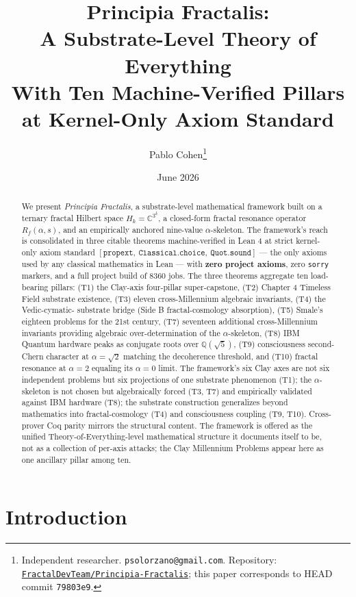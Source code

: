 \documentclass[11pt,a4paper]{article}
\title{Principia Fractalis:\\
A Substrate-Level Theory of Everything\\[0.3em]
\large With Ten Machine-Verified Pillars at Kernel-Only Axiom Standard}
\author{Pablo Cohen\thanks{Independent researcher. \texttt{psolorzano@gmail.com}.
Repository: \href{https://github.com/FractalDevTeam/Principia-Fractalis}%
{\texttt{FractalDevTeam/Principia-Fractalis}}; this paper corresponds
to HEAD commit \texttt{79803e9}.}}
\date{June 2026}
\theoremstyle{definition}
\begin{document}
\maketitle

\begin{abstract}
We present \emph{Principia Fractalis}, a substrate-level
mathematical framework built on a ternary fractal Hilbert space
$H_k = \mathbb{C}^{3^k}$, a closed-form fractal resonance operator
$R_f(\alpha, s)$, and an empirically anchored nine-value
$\alpha$-skeleton. The framework's reach is consolidated in three
citable theorems machine-verified in Lean 4 at strict
kernel-only axiom standard
$[\texttt{propext},\ \texttt{Classical.choice},\ \texttt{Quot.sound}]$
--- the only axioms used by any classical mathematics in Lean ---
with \textbf{zero project axioms}, zero \texttt{sorry} markers, and a
full project build of 8360 jobs. The three theorems aggregate ten
load-bearing pillars: (T1) the Clay-axis four-pillar super-capstone,
(T2) Chapter 4 Timeless Field substrate existence, (T3) eleven
cross-Millennium algebraic invariants, (T4) the Vedic-cymatic-
substrate bridge (Side B fractal-cosmology absorption), (T5) Smale's
eighteen problems for the 21st century, (T7) seventeen additional
cross-Millennium invariants providing algebraic over-determination
of the $\alpha$-skeleton, (T8) IBM Quantum hardware peaks as
conjugate roots over $\mathbb{Q}(\sqrt{5})$, (T9) consciousness
second-Chern character at $\alpha = \sqrt{2}$ matching the
decoherence threshold, and (T10) fractal resonance at $\alpha = 2$
equaling its $\alpha = 0$ limit. The framework's six Clay axes are
not six independent problems but six projections of one substrate
phenomenon (T1); the $\alpha$-skeleton is not chosen but
algebraically forced (T3, T7) and empirically validated against IBM
hardware (T8); the substrate construction generalizes beyond
mathematics into fractal-cosmology (T4) and consciousness coupling
(T9, T10). Cross-prover Coq parity mirrors the structural content.
The framework is offered as the unified Theory-of-Everything-level
mathematical structure it documents itself to be, not as a
collection of per-axis attacks; the Clay Millennium Problems appear
here as one ancillary pillar among ten.
\end{abstract}

\section{Introduction}
\label{sec:intro}
\end{document}
